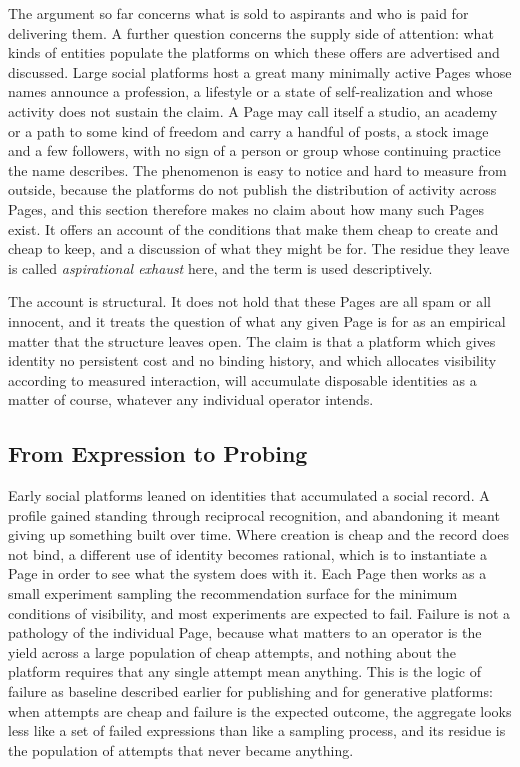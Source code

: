 \documentclass[12pt, a4paper]{article}
\begin{document}
The argument so far concerns what is sold to aspirants and who is paid for delivering them. A further question concerns the supply side of attention: what kinds of entities populate the platforms on which these offers are advertised and discussed. Large social platforms host a great many minimally active Pages whose names announce a profession, a lifestyle or a state of self-realization and whose activity does not sustain the claim. A Page may call itself a studio, an academy or a path to some kind of freedom and carry a handful of posts, a stock image and a few followers, with no sign of a person or group whose continuing practice the name describes. The phenomenon is easy to notice and hard to measure from outside, because the platforms do not publish the distribution of activity across Pages, and this section therefore makes no claim about how many such Pages exist. It offers an account of the conditions that make them cheap to create and cheap to keep, and a discussion of what they might be for. The residue they leave is called \emph{aspirational exhaust} here, and the term is used descriptively.

The account is structural. It does not hold that these Pages are all spam or all innocent, and it treats the question of what any given Page is for as an empirical matter that the structure leaves open. The claim is that a platform which gives identity no persistent cost and no binding history, and which allocates visibility according to measured interaction, will accumulate disposable identities as a matter of course, whatever any individual operator intends.

\subsection{From Expression to Probing}

Early social platforms leaned on identities that accumulated a social record. A profile gained standing through reciprocal recognition, and abandoning it meant giving up something built over time. Where creation is cheap and the record does not bind, a different use of identity becomes rational, which is to instantiate a Page in order to see what the system does with it. Each Page then works as a small experiment sampling the recommendation surface for the minimum conditions of visibility, and most experiments are expected to fail. Failure is not a pathology of the individual Page, because what matters to an operator is the yield across a large population of cheap attempts, and nothing about the platform requires that any single attempt mean anything. This is the logic of failure as baseline described earlier for publishing and for generative platforms: when attempts are cheap and failure is the expected outcome, the aggregate looks less like a set of failed expressions than like a sampling process, and its residue is the population of attempts that never became anything.
\end{document}
